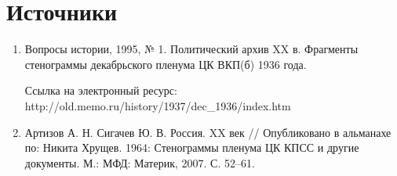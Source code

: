     \chapter{Источники}
      \begin{enumerate}
        \item Вопросы истории, 1995, № 1. Политический архив XX в. Фрагменты стенограммы декабрьского пленума ЦК ВКП(б) 1936 года.\par Ссылка на электронный ресурс: http://old.memo.ru/history/1937/dec\_1936/index.htm
        \item Артизов А. Н. Сигачев Ю. В. Россия. XX век // Опубликовано в альманахе по: Никита Хрущев. 1964: Стенограммы пленума ЦК КПСС и другие документы. М.: МФД: Материк, 2007. С. 52–61.
      \end{enumerate}
      
